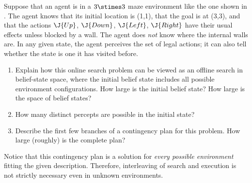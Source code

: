 
\begin{uexercise}%
Suppose that an agent is in a \(3\stimes 3\) maze environment like the
one shown in . The agent knows that its initial
location is (1,1), that the goal is at (3,3), and that the
actions \(\J{Up}\), \(\J{Down}\), \(\J{Left}\), \(\J{Right}\) have their usual effects unless
blocked by a wall. The agent does {\em not} know where the internal walls are.
In any given state, the agent perceives the set of legal actions;
it can also tell whether the state is one it has visited before.
\begin{enumerate}
\item Explain how this online search problem can be viewed
as an offline search in belief-state space,
where the initial belief state includes all possible environment
configurations. How large is the initial belief state? How large is
the space of belief states?  
\item How many distinct percepts are possible in the initial state?
\item Describe the first few branches of a contingency plan for this problem.
How large (roughly) is the complete plan?
\end{enumerate}
Notice that this contingency plan is a solution for {\em every
possible environment} fitting the given description. Therefore,
interleaving of search and execution is not strictly necessary even in
unknown environments.
\end{uexercise} 

